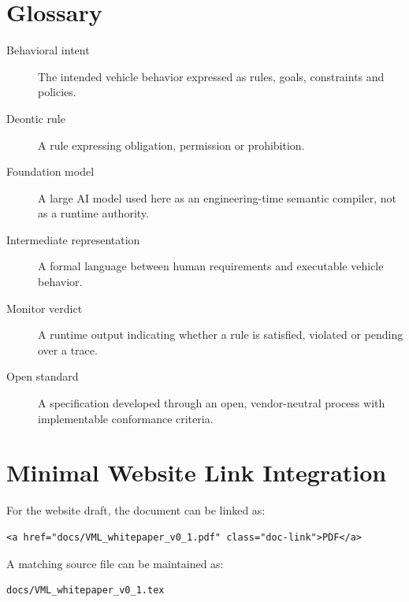 \documentclass[11pt,a4paper]{article}
\begin{document}
\section{Glossary}
\begin{description}
  \item[Behavioral intent] The intended vehicle behavior expressed as rules, goals, constraints and policies.
  \item[Deontic rule] A rule expressing obligation, permission or prohibition.
  \item[Foundation model] A large AI model used here as an engineering-time semantic compiler, not as a runtime authority.
  \item[Intermediate representation] A formal language between human requirements and executable vehicle behavior.
  \item[Monitor verdict] A runtime output indicating whether a rule is satisfied, violated or pending over a trace.
  \item[Open standard] A specification developed through an open, vendor-neutral process with implementable conformance criteria.
\end{description}

\section{Minimal Website Link Integration}
For the website draft, the document can be linked as:
\begin{verbatim}
<a href="docs/VML_whitepaper_v0_1.pdf" class="doc-link">PDF</a>
\end{verbatim}
A matching source file can be maintained as:
\begin{verbatim}
docs/VML_whitepaper_v0_1.tex
\end{verbatim}
\end{document}
